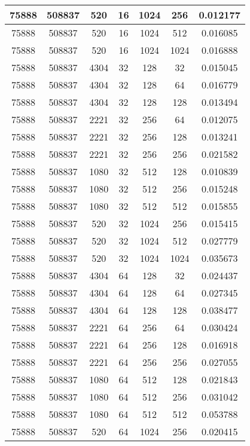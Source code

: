 \documentclass[9pt]{article}
\begin{document}
\begin{tabular}{|c|c|c|c|c|c|c| }
\hline
75888  & 508837  & 520  & 16  & 1024  & 256  & 0.012177 \\
\hline
75888  & 508837  & 520  & 16  & 1024  & 512  & 0.016085 \\
\hline
75888  & 508837  & 520  & 16  & 1024  & 1024  & 0.016888 \\
\hline
75888  & 508837  & 4304  & 32  & 128  & 32  & 0.015045 \\
\hline
75888  & 508837  & 4304  & 32  & 128  & 64  & 0.016779 \\
\hline
75888  & 508837  & 4304  & 32  & 128  & 128  & 0.013494 \\
\hline
75888  & 508837  & 2221  & 32  & 256  & 64  & 0.012075 \\
\hline
75888  & 508837  & 2221  & 32  & 256  & 128  & 0.013241 \\
\hline
75888  & 508837  & 2221  & 32  & 256  & 256  & 0.021582 \\
\hline
75888  & 508837  & 1080  & 32  & 512  & 128  & 0.010839 \\
\hline
75888  & 508837  & 1080  & 32  & 512  & 256  & 0.015248 \\
\hline
75888  & 508837  & 1080  & 32  & 512  & 512  & 0.015855 \\
\hline
75888  & 508837  & 520  & 32  & 1024  & 256  & 0.015415 \\
\hline
75888  & 508837  & 520  & 32  & 1024  & 512  & 0.027779 \\
\hline
75888  & 508837  & 520  & 32  & 1024  & 1024  & 0.035673 \\
\hline
75888  & 508837  & 4304  & 64  & 128  & 32  & 0.024437 \\
\hline
75888  & 508837  & 4304  & 64  & 128  & 64  & 0.027345 \\
\hline
75888  & 508837  & 4304  & 64  & 128  & 128  & 0.038477 \\
\hline
75888  & 508837  & 2221  & 64  & 256  & 64  & 0.030424 \\
\hline
75888  & 508837  & 2221  & 64  & 256  & 128  & 0.016918 \\
\hline
75888  & 508837  & 2221  & 64  & 256  & 256  & 0.027055 \\
\hline
75888  & 508837  & 1080  & 64  & 512  & 128  & 0.021843 \\
\hline
75888  & 508837  & 1080  & 64  & 512  & 256  & 0.031042 \\
\hline
75888  & 508837  & 1080  & 64  & 512  & 512  & 0.053788 \\
\hline
75888  & 508837  & 520  & 64  & 1024  & 256  & 0.020415 \\

\end{tabular}
\end{document}
